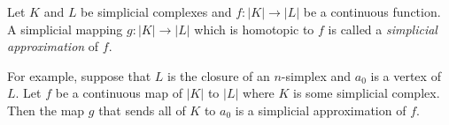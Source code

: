 \documentclass[12pt]{article}
\begin{document}
Let $K$ and $L$ be simplicial complexes and $f: |K| \to |L|$ be a continuous function.
A simplicial mapping $g: |K| \to |L|$ which is homotopic to $f$ is called
a \emph{simplicial approximation} of $f$.

For example, suppose that $L$ is the closure of an $n$-simplex and $a_0$ is a vertex of $L$. Let $f$ be a continuous map of $|K|$ to $|L|$ where $K$ 
is some simplicial complex. Then the map $g$ that sends all of $K$ to $a_0$ is
a simplicial approximation of $f$. 
\end{document}
